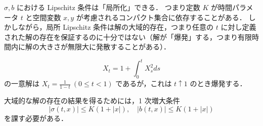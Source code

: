 \documentclass{jsarticle}
\begin{document}
\begin{remark*}
    $\sigma, b$ における Lipschitz 条件は「局所化」できる．
    つまり定数 $K$ が時間パラメータ $t$ と空間変数 $x, y$ が考慮されるコンパクト集合に依存することがある．
    しかしながら，局所 Lipschitz 条件は解の大域的存在，つまり任意の $t$ に対し定義された解の存在を保証するのに十分ではない（解が「爆発」する，つまり有限時間内に解の大きさが無限大に発散することがある）．

    \begin{ex*}
        $$
        X_t
        = 1+\int_0^t X_s^2 ds
        $$
        の一意解は $X_t=\frac{1}{1-t}\ (0\le t<1)$ であるが，これは $t\uparrow1$ のとき爆発する．
    \end{ex*}
    
    大域的な解の存在の結果を得るためには，1 次増大条件
    $$
    \left\lvert \sigma(t, x)\right\rvert\le K(1+\left\lvert x\right\rvert), \quad
    \left\lvert b(t, x)\right\rvert\le K(1+\left\lvert x\right\rvert)
    $$
    を課す必要がある．
\end{remark*}
\end{document}
